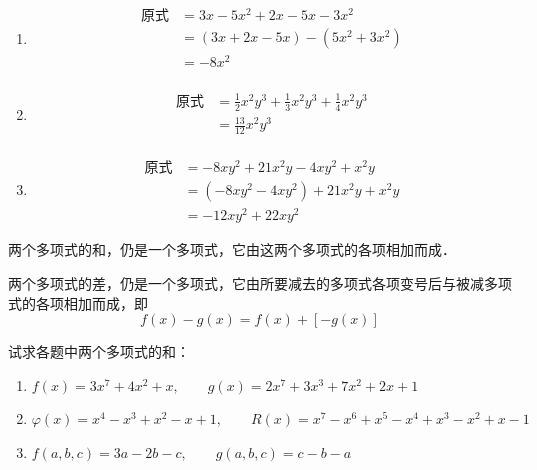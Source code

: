 \begin{solution}
    \begin{enumerate}
        \item \begin{align*}
            \text{原式}&=3x-5x^2+2x-5x-3x^2 \tag{去括号}\\
            &=(3x+2x-5x)-(5x^2+3x^2)\tag{交换、结合律}\\
            &=-8x^2 \tag{合并同类项法则}\\
        \end{align*}
        \item \begin{align*}
            \text{原式}&=\frac{1}{2}x^2y^3+\frac{1}{3}x^2y^3+\frac{1}{4}x^2y^3\tag{去括号}\\
            &=\frac{13}{12}x^2y^3  \tag{合并同类项法则}\\
        \end{align*}
        \item \begin{align*}
            \text{原式}&=-8xy^2+21x^2y-4xy^2+x^2y\\
            &=(-8xy^2-4xy^2)+21x^2y+x^2y\\
            &=-12xy^2+22xy^2
        \end{align*}
    \end{enumerate}
\end{solution}

两个多项式的和，仍是一个多项式，它由这两个多项式的各项相加而成．

两个多项式的差，仍是一个多项式，它由所要减去的多项式各项变号后与被减多项式的各项相加而成，即 
\[f(x)-g(x)=f(x)+[-g(x)]\]

\begin{example}
    试求各题中两个多项式的和：
\begin{enumerate}
    \item $f(x)=3x^7+4x^2+x,\qquad g(x)=2x^7+3x^3+7x^2+2x+1$
    \item $\varphi(x)=x^4-x^3+x^2-x+1,\qquad R(x)=x^7-x^6+x^5-x^4+x^3-x^2+x-1$
    \item $f(a,b,c)=3a-2b-c,\qquad g(a,b,c)=c-b-a$
\end{enumerate}

\end{example}

